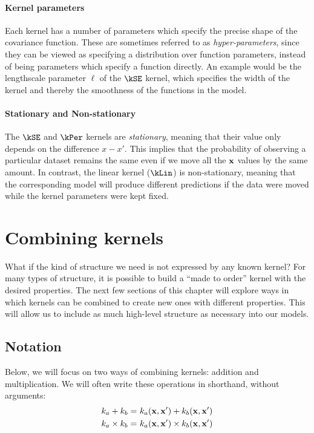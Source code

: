 \paragraph{Kernel parameters}
Each kernel has a number of parameters which specify the precise shape of the covariance function.
These are sometimes referred to as \emph{hyper-parameters}, since they can be viewed as specifying a distribution over function parameters, instead of being parameters which specify a function directly.
An example would be the lengthscale parameter $\ell$ of the $\kSE$ kernel, which specifies the width of the kernel and thereby the smoothness of the functions in the model. 


\paragraph{Stationary and Non-stationary}
The $\kSE$ and $\kPer$ kernels are \emph{stationary}, meaning that their value only depends on the difference $x-x'$.  This implies that the probability of observing a particular dataset remains the same even if we move all the ${\bf{x}}$ values by the same amount.
In contrast, the linear kernel ($\kLin$) is non-stationary, meaning that the corresponding \gp{} model will produce different predictions if the data were moved while the kernel parameters were kept fixed.




\section{Combining kernels}

What if the kind of structure we need is not expressed by any known kernel?
For many types of structure, it is possible to build a ``made to order'' kernel with the desired properties.
The next few sections of this chapter will explore ways in which kernels can be combined to create new ones with different properties.
This will allow us to include as much high-level structure as necessary into our models.


\subsection{Notation}

Below, we will focus on two ways of combining kernels: addition and multiplication.
We will often write these operations in shorthand, without arguments:
%
\begin{align}
k_a + k_b =& \,\, k_a({\bf{x}}, {\bf{x}}') + k_b( {\bf{x}}, {\bf{x}}')\\
k_a \times k_b =& \,\, k_a({\bf{x}}, {\bf{x}}') \times k_b({\bf{x}}, {\bf{x}}')
\end{align}

